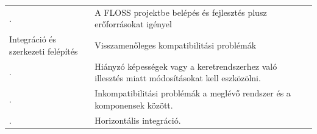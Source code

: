 \documentclass[12pt,magyar,a4paper,oneside]{scrreprt}
\begin{document}
\begin{longtable}[]{@{}lll@{}}
\begin{minipage}[t]{0.24\columnwidth}\raggedright
.\strut
\end{minipage} & \begin{minipage}[t]{0.49\columnwidth}\raggedright
A FLOSS projektbe belépés és fejlesztés plusz erőforrásokat
igényel\strut
\end{minipage} & \begin{minipage}[t]{0.18\columnwidth}\raggedright
\strut
\end{minipage}\tabularnewline
\begin{minipage}[t]{0.24\columnwidth}\raggedright
Integráció és szerkezeti felépítés\strut
\end{minipage} & \begin{minipage}[t]{0.49\columnwidth}\raggedright
Visszamenőleges kompatibilitási problémák\strut
\end{minipage} & \begin{minipage}[t]{0.18\columnwidth}\raggedright
\strut
\end{minipage}\tabularnewline
\begin{minipage}[t]{0.24\columnwidth}\raggedright
.\strut
\end{minipage} & \begin{minipage}[t]{0.49\columnwidth}\raggedright
Hiányzó képességek vagy a keretrendszerhez való illesztés miatt
módosításokat kell eszközölni.\strut
\end{minipage} & \begin{minipage}[t]{0.18\columnwidth}\raggedright
\strut
\end{minipage}\tabularnewline
\begin{minipage}[t]{0.24\columnwidth}\raggedright
.\strut
\end{minipage} & \begin{minipage}[t]{0.49\columnwidth}\raggedright
Inkompatibilitási problémák a meglévő rendszer és a komponensek
között.\strut
\end{minipage} & \begin{minipage}[t]{0.18\columnwidth}\raggedright
\strut
\end{minipage}\tabularnewline
\begin{minipage}[t]{0.24\columnwidth}\raggedright
.\strut
\end{minipage} & \begin{minipage}[t]{0.49\columnwidth}\raggedright
Horizontális integráció.\strut
\end{minipage} & \begin{minipage}[t]{0.18\columnwidth}\raggedright

\end{minipage}
\end{longtable}
\end{document}
